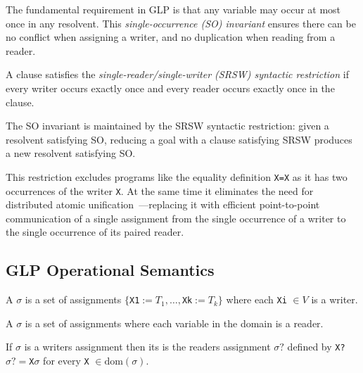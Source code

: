 The fundamental requirement in GLP is that any variable may occur at most once in any resolvent. This \emph{single-occurrence (SO) invariant} ensures there can be no conflict when assigning a writer, and no duplication when reading from a reader.

A clause satisfies the \emph{single-reader/single-writer (SRSW) syntactic restriction} if every writer occurs exactly once and every reader occurs exactly once in the clause.

The SO invariant is maintained by the SRSW syntactic restriction: given a resolvent satisfying SO, reducing a goal with a clause satisfying SRSW produces a new resolvent satisfying SO.

This restriction excludes programs like the equality definition \verb|X=X| as it has two occurrences of the writer \verb|X|. At the same time it eliminates the need for distributed atomic unification~\cite{kleinman1990distributed}—replacing it with efficient point-to-point communication of a single assignment from the single occurrence of a writer to the single occurrence of its paired reader.

\subsection{GLP Operational Semantics}

\begin{definition}\label{definition:writers-assignment}
A  $\sigma$ is a set of assignments $\{$\verb|X1|$ := T_1, \ldots, $\verb|Xk|$ := T_k\}$ where each \verb|Xi| $\in V$ is a writer.

A  $\sigma$ is a set of assignments where each variable in the domain is a reader.

If $\sigma$ is a writers assignment then its  is the readers assignment $\sigma?$ defined by \verb|X?|$\sigma? = $\verb|X|$\sigma$ for every \verb|X| $\in \mathrm{dom}(\sigma)$.
\end{definition}


